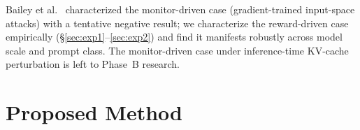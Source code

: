 \documentclass{article}
\begin{document}
Bailey et al.~\cite{bailey2024obfuscated} characterized the monitor-driven case (gradient-trained input-space attacks) with a tentative negative result; we characterize the reward-driven case empirically (§\ref{sec:exp1}--\ref{sec:exp2}) and find it manifests robustly across model scale and prompt class. The monitor-driven case under inference-time KV-cache perturbation is left to Phase~B research.


\section{Proposed Method}\label{sec:method}
\end{document}
